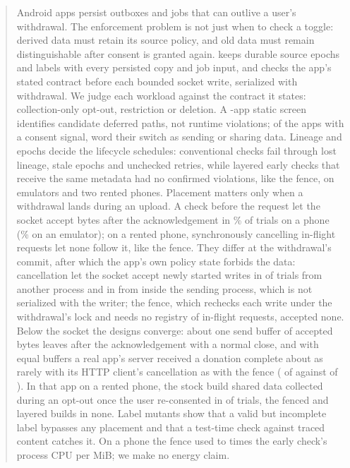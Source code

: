 \begin{abstract}
Android apps persist outboxes and jobs that can outlive a user's withdrawal.
The enforcement problem is not just when to check a toggle: derived data must retain its source policy, and old data must remain distinguishable after consent is granted again.
\sys keeps durable source epochs and labels with every persisted copy and job input, and checks the app's stated contract before each bounded socket write, serialized with withdrawal.
We judge each workload against the contract it states: collection-only opt-out, restriction or deletion.
A \corpusN-app static screen identifies candidate deferred paths, not runtime violations; of the \promiseApps{} apps with a consent signal, \promisePending{} word their switch as sending or sharing data.
Lineage and epochs decide the lifecycle schedules: conventional checks fail through lost lineage, stale epochs and unchecked retries, while layered early checks that receive the same metadata had no confirmed violations, like the fence, on emulators and two rented phones.
Placement matters only when a withdrawal lands during an upload.
A check before the request let the socket accept bytes after the acknowledgement in \racePhoneObsPct{}\% of trials on a phone (\raceObsPct{}\% on an emulator); on a rented phone, synchronously cancelling in-flight requests let none follow it, like the fence.
They differ at the withdrawal's commit, after which the app's own policy state forbids the data: cancellation let the socket accept newly started writes in \dfCloseAll{} of \dfArmN{} trials from another process and in \dfCloseTwoAll{} from inside the sending process, which is not serialized with the writer; the fence, which rechecks each write under the withdrawal's lock and needs no registry of in-flight requests, accepted none.
Below the socket the designs converge: about one send buffer of accepted bytes leaves after the acknowledgement with a normal close, and with equal buffers a real app's server received a donation complete about as rarely with its HTTP client's cancellation as with the fence (\gbSixteenRx{} of \gbSixteenN{} against \gbFenceRx{} of \gbFenceN{}).
In that app on a rented phone, the stock build shared data collected during an opt-out once the user re-consented in \dfAirStockPK{} of \dfAirPKN{} trials, the fenced and layered builds in none.
Label mutants show that a valid but incomplete label bypasses any placement and that a test-time check against traced content catches it.
On a phone the fence used \gdCpuLo{} to \gdCpuHi{} times the early check's process CPU per MiB; we make no energy claim.
\end{abstract}
